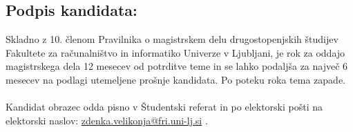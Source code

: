 \documentclass[a4paper,11pt]{article}
\begin{document}
\subsection*{Podpis kandidata:}
\vspace*{2\baselineskip}
\singlespacing

\vfill
\noindent\makebox[\linewidth]{\rule{\textwidth}{0.4pt}}
Skladno z 10. členom Pravilnika o magistrskem delu drugostopenjskih študijev Fakultete za računalništvo in informatiko Univerze v Ljubljani, je rok za oddajo magistrskega dela 12 mesecev od potrditve teme in se lahko podaljša za največ 6 mesecev na podlagi utemeljene prošnje kandidata. Po poteku roka tema zapade.
\\\\
Kandidat obrazec odda pisno v Študentski referat in po elektorski pošti na elektorski naslov: \href{mailto:zdenka.velikonja@fri.uni-lj.si}{zdenka.velikonja@fri.uni-lj.si}
.
\end{document}
